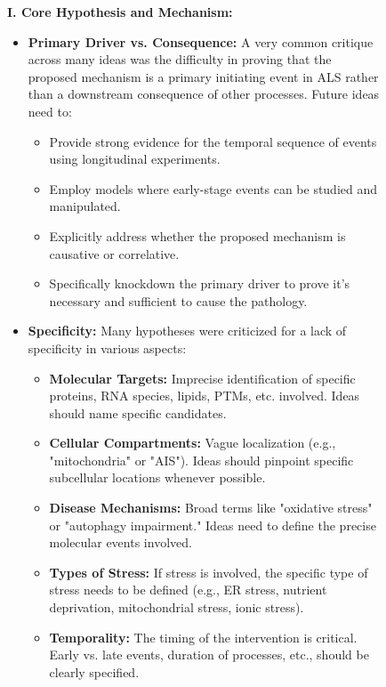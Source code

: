 \begin{figure}[htbp!]
\begin{tcolorbox}[
    colback=black!5!white,
    colframe=black!60!white,
    title=\textbf{Example output of a critique by the Meta-review agent},
    fonttitle=\bfseries,
    arc=3mm,
    boxrule=1pt,
    bottomrule=2pt,
]
\footnotesize
\textbf{I. Core Hypothesis and Mechanism:}
\begin{itemize}
    \item \textbf{Primary Driver vs. Consequence:} A very common critique across many ideas was the difficulty in proving that the proposed mechanism is a primary initiating event in ALS rather than a downstream consequence of other processes. Future ideas need to:
    \begin{itemize}
        \item Provide strong evidence for the temporal sequence of events using longitudinal experiments.
        \item Employ models where early-stage events can be studied and manipulated.
        \item Explicitly address whether the proposed mechanism is causative or correlative.
        \item Specifically knockdown the primary driver to prove it's necessary and sufficient to cause the pathology.
    \end{itemize}
    \item \textbf{Specificity:} Many hypotheses were criticized for a lack of specificity in various aspects:
    \begin{itemize}
        \item \textbf{Molecular Targets:} Imprecise identification of specific proteins, RNA species, lipids, PTMs, etc. involved. Ideas should name specific candidates.
        \item \textbf{Cellular Compartments:} Vague localization (e.g., "mitochondria" or "AIS"). Ideas should pinpoint specific subcellular locations whenever possible.
        \item \textbf{Disease Mechanisms:} Broad terms like "oxidative stress" or "autophagy impairment." Ideas need to define the precise molecular events involved.
        \item \textbf{Types of Stress:} If stress is involved, the specific type of stress needs to be defined (e.g., ER stress, nutrient deprivation, mitochondrial stress, ionic stress).
        \item \textbf{Temporality:} The timing of the intervention is critical. Early vs. late events, duration of processes, etc., should be clearly specified.

\end{itemize}
\end{itemize}
\end{tcolorbox}
\end{figure}
